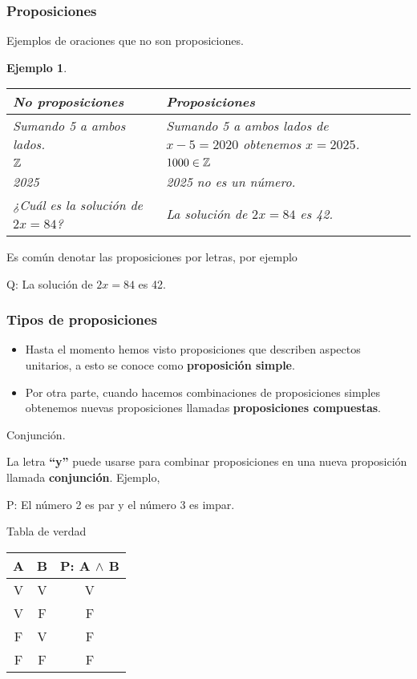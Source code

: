 \documentclass[10pt]{beamer}
\newtheorem{ejemplo}{Ejemplo}
\begin{document}
    \begin{frame}
        \frametitle{Proposiciones}
        Ejemplos de oraciones que no son proposiciones.
        \begin{ejemplo}
            \begin{tabular}{l | p{6cm}}
                \hline
                No proposiciones & Proposiciones \\\hline\hline
                Sumando 5 a ambos lados. & Sumando 5 a ambos lados de $x - 5 = 2020$ obtenemos $x = 2025$. \\\hline
                $\mathbb{Z}$ & $1000 \in \mathbb{Z}$\\\hline
                2025 & 2025 no es un número.\\\hline
                ¿Cuál es la solución de $2x = 84$? & La solución de $2x = 84$ es 42.
            \end{tabular}
        \end{ejemplo}

        Es común denotar las proposiciones por letras, por ejemplo
        \begin{center}
            Q: La solución de $2x = 84$ es 42.
        \end{center}
    \end{frame}


    \begin{frame}
        \frametitle{Tipos de proposiciones}
        \begin{itemize}
            \item Hasta el momento hemos visto proposiciones que describen aspectos unitarios, a esto se conoce como \textbf{proposición simple}.
            \item Por otra parte, cuando hacemos combinaciones de proposiciones simples obtenemos nuevas proposiciones llamadas \textbf{proposiciones compuestas}.
        \end{itemize}

        \vspace{2mm}
        Conjunción.

        La letra \textbf{``y''} puede usarse para combinar proposiciones en una nueva proposición llamada \textbf{conjunción}.
        Ejemplo,
        \begin{center}
            P: El número 2 es par y el número 3 es impar.
        \end{center}
        Tabla de verdad
        \begin{center}
            \begin{tabular}{| c | c || c |}
                \hline
                A & B & P: A $\land$ B \\\hline\hline
                V & V & V\\\hline
                V & F & F\\\hline
                F & V & F\\\hline
                F & F & F\\\hline
            \end{tabular}
        \end{center}
    \end{frame}
\end{document}
